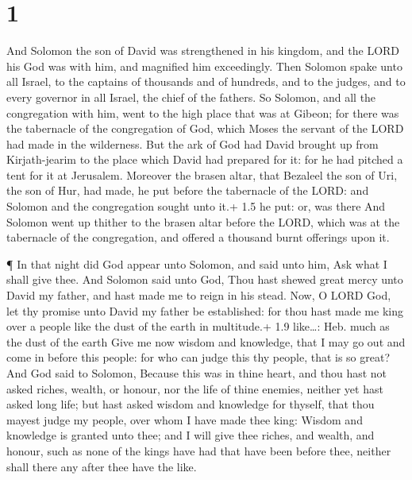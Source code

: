 \hypertarget{section}{%
\section{1}\label{section}}

 And Solomon the son of David was strengthened in his
kingdom, and the LORD his God was with him, and magnified him
exceedingly.  Then Solomon spake unto all Israel, to the
captains of thousands and of hundreds, and to the judges, and to every
governor in all Israel, the chief of the fathers.  So
Solomon, and all the congregation with him, went to the high place that
was at Gibeon; for there was the tabernacle of the congregation of God,
which Moses the servant of the LORD had made in the wilderness.
 But the ark of God had David brought up from Kirjath-jearim
to the place which David had prepared for it: for he had pitched a tent
for it at Jerusalem.  Moreover the brasen altar, that
Bezaleel the son of Uri, the son of Hur, had made, he put before the
tabernacle of the LORD: and Solomon and the congregation sought unto
it.+ 1.5 he put: or, was there  And Solomon went up thither
to the brasen altar before the LORD, which was at the tabernacle of the
congregation, and offered a thousand burnt offerings upon it.

 ¶ In that night did God appear unto Solomon, and said unto
him, Ask what I shall give thee.  And Solomon said unto God,
Thou hast shewed great mercy unto David my father, and hast made me to
reign in his stead.  Now, O LORD God, let thy promise unto
David my father be established: for thou hast made me king over a people
like the dust of the earth in multitude.+ 1.9 like\ldots: Heb. much as
the dust of the earth  Give me now wisdom and knowledge,
that I may go out and come in before this people: for who can judge this
thy people, that is so great?  And God said to Solomon,
Because this was in thine heart, and thou hast not asked riches, wealth,
or honour, nor the life of thine enemies, neither yet hast asked long
life; but hast asked wisdom and knowledge for thyself, that thou mayest
judge my people, over whom I have made thee king:  Wisdom
and knowledge is granted unto thee; and I will give thee riches, and
wealth, and honour, such as none of the kings have had that have been
before thee, neither shall there any after thee have the like.

